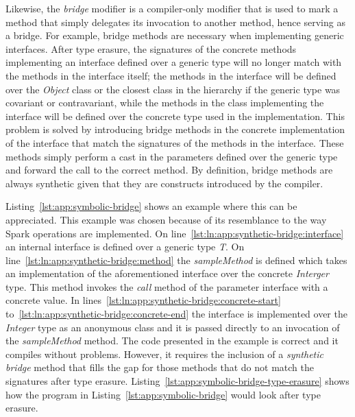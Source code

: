 Likewise, the \textit{bridge} modifier is a compiler-only modifier that is used to mark a method that simply delegates its invocation to another method, hence serving as a bridge. For example, bridge methods are necessary when implementing generic interfaces. After type erasure, the signatures of the concrete methods implementing an interface defined over a generic type will no longer match with the methods in the interface itself; the methods in the interface will be defined over the \textit{Object} class or the closest class in the hierarchy if the generic type was covariant or contravariant, while the methods in the class implementing the interface will be defined over the concrete type used in the implementation. This problem is solved by introducing bridge methods in the concrete implementation of the interface that match the signatures of the methods in the interface. These methods simply perform a cast in the parameters defined over the generic type and forward the call to the correct method. By definition, bridge methods are always synthetic given that they are constructs introduced by the compiler.

Listing~\ref{lst:app:symbolic-bridge} shows an example where this can be appreciated. This example was chosen because of its resemblance to the way Spark operations are implemented. On line~\ref{lst:ln:app:synthetic-bridge:interface} an internal interface is defined over a generic type \textit{T}. On line~\ref{lst:ln:app:synthetic-bridge:method} the \textit{sampleMethod} is defined which takes an implementation of the aforementioned interface over the concrete \textit{Interger} type. This method invokes the \textit{call} method of the parameter interface with a concrete value. In lines~\ref{lst:ln:app:synthetic-bridge:concrete-start} to~\ref{lst:ln:app:synthetic-bridge:concrete-end} the interface is implemented over the \textit{Integer} type as an anonymous class and it is passed directly to an invocation of the \textit{sampleMethod} method. The code presented in the example is correct and it compiles without problems. However, it requires the inclusion of a \textit{synthetic bridge} method that fills the gap for those methods that do not match the signatures after type erasure. Listing~\ref{lst:app:symbolic-bridge-type-erasure} shows how the program in Listing~\ref{lst:app:symbolic-bridge} would look after type erasure. 

